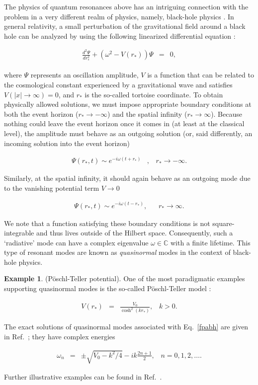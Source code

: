 \documentclass{tADP2e}
\theoremstyle{plain}
\newcommand{\eqn}[1]{
\begin{eqnarray}
	#1
\end{eqnarray}
}
\theoremstyle{plain}
\theoremstyle{definition}
\newtheorem{example}{Example}[section]
\newcommand{\exmp}[1]{
\begin{example}
	#1
\end{example}
}
\begin{document}
\vspace{3pt}
\noindent
The physics of quantum resonances above has an intriguing connection with   the problem in a very different realm of physics, namely, black-hole physics \cite{CS83}. In general relativity, a small perturbation of the gravitational field around a black hole can be analyzed by using the following linearized differential equation \cite{CS83}:
\eqn{
\frac{d^{2}\Psi}{dr_{*}^{2}}+(\omega^{2}-V(r_{*}))\Psi & = & 0,\label{fpabh}
}
where $\Psi$ represents an oscillation amplitude, $V$ is a function that can be related to the cosmological constant experienced by a gravitational wave and satisfies $V(|x|\to\infty)=0$, and $r_*$ is the so-called tortoise coordinate. To obtain physically allowed solutions, we must impose appropriate boundary conditions at both the event horizon ($r_*\to-\infty$) and  the spatial infinity ($r_*\to\infty$).  Because nothing could leave the event horizon once it comes in (at least at the classical level), the amplitude must behave as an outgoing solution (or, said differently, an incoming solution into the event horizon)
\eqn{
\Psi(r_{*},t)\sim e^{-i\omega(t+r_{*})} & ,\;\;\;r_{*}\to-\infty.
}
Similarly, at the spatial infinity, it should again behave as an outgoing mode due to the vanishing potential term $V\to 0$
\eqn{
\Psi(r_{*},t)\sim e^{-i\omega(t-r_{*})}, &\;\;\;r_{*}\to\infty.
}
We note that a function satisfying these boundary conditions is not square-integrable and thus lives outside of the Hilbert space. Consequently, such a `radiative' mode can have a complex eigenvalue $\omega\in\mathbb{C}$ with a finite lifetime. This type of resonant modes are known as {\it quasinormal} modes in the context of black-hole physics.  

\exmp{(P{\"o}schl-Teller potential). One of the most  paradigmatic examples supporting quasinormal modes is the so-called P{\"o}schl-Teller model \cite{PG33}:
\eqn{
V(r_{*}) & = & \frac{V_{0}}{\cosh^{2}(kr_{*})},\;\;\;k>0.
}
The exact solutions of quasinormal modes associated with Eq.~\eqref{fpabh} are given in Ref.~\cite{FV84}; they have complex energies
\eqn{
\omega_{n} & = & \pm\sqrt{V_{0}-k^{2}/4}-ik\frac{2n+1}{2},\;\;\;n=0,1,2,\ldots.
} 
Further illustrative examples can be found in Ref.~\cite{Berti_2009}. 
}
\end{document}

